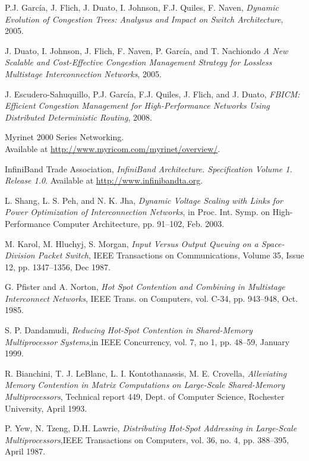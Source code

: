 \documentclass[12pt]{article}
\begin{document}
\begin{thebibliography}{99}

 P.J. Garc\'ia, J. Flich, J. Duato, I. Johnson, F.J. Quiles, F. Naven, \emph{Dynamic Evolution of Congestion Trees: Analysus and Impact on Switch Architecture}, 2005.

 J. Duato, I. Johnson, J. Flich, F. Naven, P. Garc\'ia, and T. Nachiondo \emph{A New Scalable and Cost-Effective Congestion Management Strategy for Lossless Multistage Interconnection Networks}, 2005.

 J. Escudero-Sahuquillo, P.J. Garc\'ia, F.J.  Quiles, J. Flich, and J. Duato, \emph{FBICM: Efficient Congestion Management for High-Performance Networks Using Distributed Deterministic Routing}, 2008.

 Myrinet 2000 Series	 Networking.\\
Available at 
\url{http://www.myricom.com/myrinet/overview/}.

 InfiniBand Trade Association, \emph{InfiniBand Architecture. Specification Volume 1. Release 1.0}. Available at \url{http://www.infinibandta.org}.

 L. Shang, L. S. Peh, and N. K. Jha, \emph{Dynamic Voltage Scaling with Links for Power Optimization of Interconnection Networks}, in Proc. Int. Symp. on High-Performance Computer
Architecture, pp. 91--102, Feb. 2003.

 M. Karol, M. Hluchyj, S. Morgan, \emph{Input Versus Output Queuing on a Space-Division Packet Switch}, IEEE Transactions on Communications, Volume 35, Issue 12, pp. 1347--1356, Dec 1987.

 G. Pfister and A. Norton, \emph{Hot Spot Contention and Combining in Multistage Interconnect Networks}, IEEE Trans. on Computers, vol. C-34, pp. 943--948, Oct. 1985.

 S. P. Dandamudi, \emph{Reducing Hot-Spot Contention in Shared-Memory Multiprocessor Systems},in IEEE Concurrency, vol. 7, no 1, pp. 48--59, January 1999.

 R. Bianchini, T. J. LeBlanc, L. I. Kontothanassis, M. E. Crovella, \emph{Alleviating Memory Contention in Matrix Computations on Large-Scale Shared-Memory Multiprocessors}, Technical report 449, Dept. of Computer Science, Rochester University, April 1993.

 P. Yew, N. Tzeng, D.H. Lawrie, \emph{Distributing Hot-Spot Addressing in Large-Scale Multiprocessors},IEEE Transactions on Computers, vol. 36, no. 4, pp. 388--395, April 1987.


\end{thebibliography}
\end{document}
